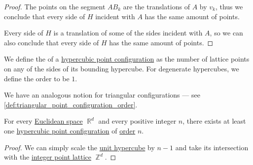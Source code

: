 \begin{proof}
  The points on the segment \( AB_k \) are the translations of \( A \) by \( v_k \), thus we conclude that every side of \( H \) incident with \( A \) has the same amount of points.

  Every side of \( H \) is a translation of some of the sides incident with \( A \), so we can also conclude that every side of \( H \) has the same amount of points.
\end{proof}

\begin{definition}\label{def:hypercubic_point_configuration_order}
  We define the  of a \hyperref[def:hypercubic_point_configuration]{hypercubic point configuration} as the number of lattice points on any of the sides of its bounding hypercube. For degenerate hypercubes, we define the order to be \( 1 \).
\end{definition}
\begin{comments}
  \item We have an analogous notion for triangular configurations --- see \cref{def:triangular_point_configuration_order}.
\end{comments}

\begin{proposition}\label{thm:hypercubic_point_configuration_existence}
  For every \hyperref[def:euclidean_space]{Euclidean space} \( \BbbR^d \) and every positive integer \( n \), there exists at least one \hyperref[def:hypercubic_point_configuration]{hypercubic point configuration} of \hyperref[def:hypercubic_point_configuration_order]{order} \( n \).
\end{proposition}
\begin{proof}
  We can simply scale the \hyperref[def:unit_hypercube]{unit hypercube} by \( n - 1 \) and take its intersection with the \hyperref[def:integer_point_lattice]{integer point lattice} \( \BbbZ^d \).
\end{proof}

